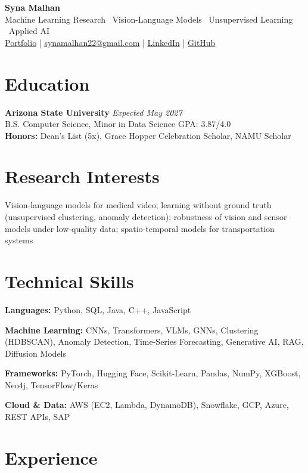\documentclass[a4paper,8pt]{extarticle}
\begin{document}
\begin{center}
{\Large \textbf{Syna Malhan}}\\
Machine Learning Research \textbullet\  Vision-Language Models \textbullet\  Unsupervised Learning \textbullet\  Applied AI\\
\href{https://synamalhan.github.io/website/}{Portfolio}
\;|\;
\href{mailto:synamalhan22@gmail.com}{synamalhan22@gmail.com}
\;|\;
\href{https://www.linkedin.com/in/synamalhan/}{LinkedIn}
\;|\;
\href{https://github.com/synamalhan}{GitHub}
\end{center}

\section*{Education}

\noindent
\textbf{Arizona State University} \hfill \textit{Expected May 2027}\\
\noindent
B.S. Computer Science, Minor in Data Science \hfill GPA: 3.87/4.0\\
\noindent
\textbf{Honors:} Dean's List (5x), Grace Hopper Celebration Scholar, NAMU Scholar

\section*{Research Interests}

\noindent
Vision-language models for medical video; learning without ground truth (unsupervised clustering, anomaly detection); robustness of vision and sensor models under low-quality data; spatio-temporal models for transportation systems

\section*{Technical Skills}

\noindent
\textbf{Languages:} Python, SQL, Java, C++, JavaScript

\noindent
\textbf{Machine Learning:} CNNs, Transformers, VLMs, GNNs, Clustering (HDBSCAN), Anomaly Detection, Time-Series Forecasting, Generative AI, RAG, Diffusion Models

\noindent
\textbf{Frameworks:} PyTorch, Hugging Face, Scikit-Learn, Pandas, NumPy, XGBoost, Neo4j, TensorFlow/Keras

\noindent
\textbf{Cloud \& Data:} AWS (EC2, Lambda, DynamoDB), Snowflake, GCP, Azure, REST APIs, SAP

\section*{Experience}
\end{document}
